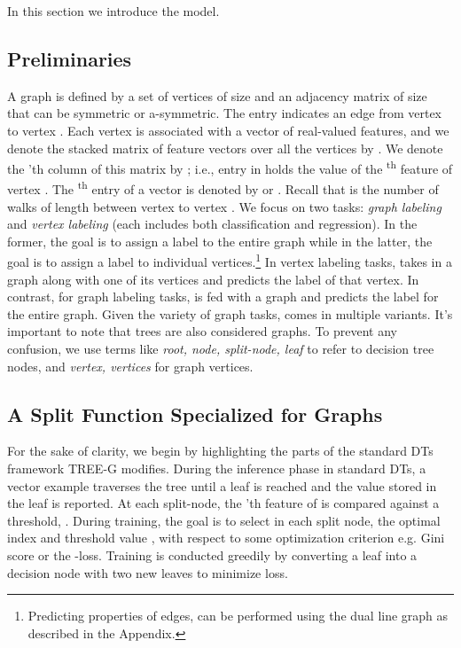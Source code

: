 In this section we introduce the \acronym model.





\subsection{Preliminaries}



A graph  is defined by a set of vertices  of size  and an adjacency matrix  of size  that can be symmetric or a-symmetric. The entry  indicates an edge from vertex  to vertex .
Each vertex is associated with a vector of  real-valued features, and we denote the stacked matrix of feature vectors over all the vertices by . We denote the 'th column of this matrix by ; i.e., entry  in   holds the value of the \textsuperscript{th} feature of vertex . The \textsuperscript{th} entry of a vector  is denoted by  or . 
Recall that  is the number of walks of length  between vertex  to vertex .
We focus on two tasks: \textit{graph labeling} and \textit{vertex labeling} (each includes both classification and regression). In the former, the goal is to assign a label to the entire graph while in the latter, the goal is to assign a label to individual vertices.\footnote{Predicting properties of edges, can be performed using the dual line graph as described in the Appendix.}
In vertex labeling tasks, \acronym takes in a graph along with one of its vertices and predicts the label of that vertex. In contrast, for graph labeling tasks, \acronym is fed with a graph and predicts the label for the entire graph.
Given the variety of graph tasks, \acronym comes in multiple variants.
It's important to note that trees are also considered graphs. To prevent any confusion, we use terms like \textit{root, node, split-node, leaf} to refer to decision tree nodes, and \textit{vertex, vertices} for graph vertices.
















\subsection{A Split Function Specialized for Graphs}
For the sake of clarity, we begin by highlighting the parts of the standard DTs framework TREE-G modifies. 
During the inference phase in standard DTs, a vector example  traverses the tree until a leaf is reached and the value stored in the leaf is reported. At each split-node, the 'th feature of  is compared against a threshold, . During training, the goal is to select in each split node, the optimal index  and threshold value , with respect to some optimization criterion e.g. Gini score or the -loss.
Training is conducted greedily by converting a leaf into a decision node with two new leaves to minimize loss.

